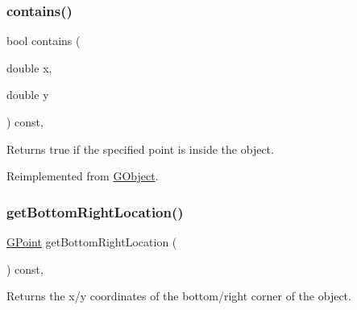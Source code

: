 \mbox{\label{classsgl_1_1GArc_ad973a1d55799d3a73bf8b04986cd804e}} 
\subsubsection{\texorpdfstring{contains()}{contains()}\hspace{0.1cm}{\footnotesize\ttfamily [2/2]}}
{\footnotesize\ttfamily bool contains (\begin{DoxyParamCaption}\item[{double}]{x,  }\item[{double}]{y }\end{DoxyParamCaption}) const\hspace{0.3cm}{\ttfamily [override]}, {\ttfamily [virtual]}}



Returns {\ttfamily true} if the specified point is inside the object. 



Reimplemented from \mbox{\hyperlink{classsgl_1_1GObject_abb6a5d7c03e6eaaae97264c4799ce7c3}{G\+Object}}.

\mbox{\label{classsgl_1_1GObject_a0d41183bf6b08de66fe3907551aab0d7}} 
\subsubsection{\texorpdfstring{get\+Bottom\+Right\+Location()}{getBottomRightLocation()}}
{\footnotesize\ttfamily \mbox{\hyperlink{structsgl_1_1GPoint}{G\+Point}} get\+Bottom\+Right\+Location (\begin{DoxyParamCaption}{ }\end{DoxyParamCaption}) const\hspace{0.3cm}{\ttfamily [virtual]}, {\ttfamily [inherited]}}



Returns the x/y coordinates of the bottom/right corner of the object. 

\mbox{\label{classsgl_1_1GObject_a4316a2406c18e1c6d061fe51fd355490}} 
